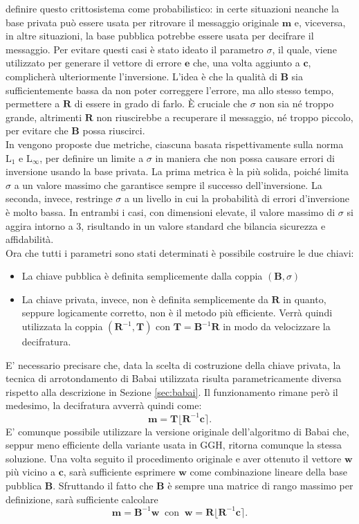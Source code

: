 definire questo crittosistema come probabilistico: in certe situazioni neanche la base
privata può essere usata per ritrovare il messaggio originale $\mathbf{m}$ e, viceversa, 
in altre situazioni, la base pubblica potrebbe essere usata per decifrare il messaggio. 
Per evitare questi casi è stato ideato il parametro $\sigma$, il 
quale, viene utilizzato per generare il vettore di errore $\mathbf{e}$ che, una volta 
aggiunto a $\mathbf{c}$, complicherà ulteriormente l'inversione. L'idea è che la
qualità di $\mathbf{B}$ sia sufficientemente bassa da non poter correggere l'errore,
ma allo stesso tempo, permettere a $\mathbf{R}$ di essere in grado di farlo. 
È cruciale che $\sigma$ non sia né troppo grande, altrimenti $\mathbf{R}$ non riuscirebbe 
a recuperare il messaggio, né troppo piccolo, per evitare che $\mathbf{B}$ possa riuscirci.
\\
In \cite[Sezione 3.2]{GGH97} vengono proposte due metriche, ciascuna basata rispettivamente
sulla norma $\text{L}_1$ e $\text{L}_\infty$, per definire un limite a
$\sigma$ in maniera che non possa causare errori di inversione usando la base privata.
La prima metrica è la più solida, poiché limita $\sigma$ a un valore massimo che garantisce 
sempre il successo dell'inversione. La seconda, invece, restringe $\sigma$ a un livello 
in cui la probabilità di errori d'inversione è molto bassa. In entrambi i casi, con 
dimensioni elevate, il valore massimo di $\sigma$ si aggira intorno a 3, risultando in un 
valore standard che bilancia sicurezza e affidabilità.
\\
Ora che tutti i parametri sono stati determinati è possibile costruire le due chiavi:
\begin{itemize}
    \item La chiave pubblica è definita semplicemente dalla coppia $(\mathbf{B}, \sigma)$
    \item La chiave privata, invece, non è definita semplicemente da $\mathbf{R}$ in quanto,
    seppure logicamente corretto, non è il metodo più efficiente. Verrà quindi utilizzata
    la coppia $(\mathbf{R}^{-1},\mathbf{T})$ con $\mathbf{T} = \mathbf{B}^{-1}\mathbf{R}$
    in modo da velocizzare la decifratura.
\end{itemize}
E' necessario precisare che, data la scelta di costruzione della chiave privata, la tecnica
di arrotondamento di Babai utilizzata risulta parametricamente diversa rispetto alla descrizione
in Sezione \ref{sec:babai}. Il funzionamento rimane però il medesimo, la decifratura avverrà
quindi come:
\[
    \mathbf{m} = \mathbf{T} \lfloor \mathbf{R}^{-1}\mathbf{c}\rceil. 
\]
E' comunque possibile utilizzare la versione originale dell'algoritmo di Babai che,
seppur meno efficiente della variante usata in GGH, ritorna comunque la stessa
soluzione. Una volta seguito il procedimento originale e aver ottenuto il vettore $\mathbf{w}$ 
più vicino a $\mathbf{c}$, sarà sufficiente esprimere 
$\mathbf{w}$ come combinazione lineare della base pubblica $\mathbf{B}$. Sfruttando il fatto
che $\mathbf{B}$ è sempre una matrice di rango massimo per definizione, sarà sufficiente calcolare
\[
    \mathbf{m} = \mathbf{B}^{-1}\mathbf{w}
    \ \text{ con } \ \mathbf{w} = \mathbf{R}\lfloor\mathbf{R}^{-1}\mathbf{c}\rceil.
\]
